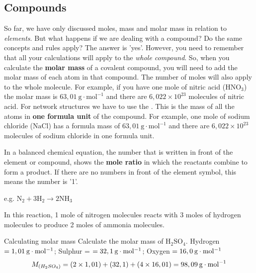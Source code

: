             \subsection*{Compounds}
            \nopagebreak
      \label{m38717*id278284}So far, we have only discussed moles, mass and molar mass in relation to \textsl{elements}. But what happens if we are dealing with a compound? Do the same concepts and rules apply? The answer is 'yes'. However, you need to remember that all your calculations will apply to the \textsl{whole compound}. So, when you calculate the \textbf{molar mass} of a covalent compound, you will need to add the molar mass of each atom in that compound. The number of moles will also apply to the whole molecule. For example, if you have one mole of nitric acid ($\text{HNO}_{3}$) the molar mass is $63,01~\text{g}\cdot{\text{mol}}^{-1}$ and there are $6,022 \times 10^{23}$ molecules of nitric acid. For network structures we have to use the . This is the mass of all the atoms in \textbf{one formula unit} of the compound. For example, one mole of sodium chloride ($\text{NaCl}$) has a formula mass of $63,01~\text{g}\cdot{\text{mol}}^{-1}$ and there are $6,022 \times 10^{23}$ molecules of sodium chloride in one formula unit. \par 
      \label{m38717*id278429}In a balanced chemical equation, the number that is written in front of the element or compound, shows the \textbf{mole ratio} in which the reactants combine to form a product. If there are no numbers in front of the element symbol, this means the number is '1'.\par 
      \label{m38717*id278442}e.g. ${\text{N}}_{2}+3{\text{H}}_{2}\to 2\text{N}{\text{H}}_{3}$\par 
      \label{m38717*id278488}In this reaction, 1 mole of nitrogen molecules reacts with 3 moles of hydrogen molecules to produce 2 moles of ammonia molecules.\par 
\label{m38717*secfhsst!!!underscore!!!id566}
      \begin{wex}{Calculating molar mass }{
      \label{m38717*probfhsst!!!underscore!!!id567}
      \label{m38717*id278505}Calculate the molar mass of $\text{H}{}_{2}\text{SO}{}_{4}$.
      }
{
      \label{m38717*id278575}Hydrogen $=1,01\phantom{\rule{2pt}{0ex}}\text{g}\ensuremath{\cdot}\text{mol}{}^{-1}$; Sulphur = $=32,1\phantom{\rule{2pt}{0ex}}\text{g}\ensuremath{\cdot}\text{mol}{}^{-1}$; Oxygen $=16,0\phantom{\rule{2pt}{0ex}}\text{g}\ensuremath{\cdot}\text{mol}{}^{-1}$ 
      \label{m38717*id278632}\nopagebreak\noindent{}
    \begin{equation*}
    {M}_{\left({H}_{2}S{O}_{4}\right)}=\left(2\ensuremath{\times}1,01\right)+\left(32,1\right)+\left(4\ensuremath{\times}16,01\right)=98,09\phantom{\rule{2pt}{0ex}}\text{g}\ensuremath{\cdot}{\text{mol}}^{-1}
      \end{equation*}
}
    \end{wex}
    \noindent

